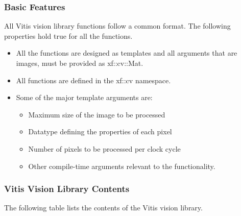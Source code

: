 \subsubsection{Basic Features}
All Vitis vision library functions follow a common format. The following properties hold true for all the functions.
\begin{itemize}
    \item All the functions are designed as templates and all arguments that are images, must be provided as xf::cv::Mat.
    \item All functions are defined in the xf::cv namespace.
    \item Some of the major template arguments are: 
    \begin{itemize}
        \item Maximum size of the image to be processed
        \item Datatype defining the properties of each pixel
        \item Number of pixels to be processed per clock cycle
        \item Other compile-time arguments relevant to the functionality.
    \end{itemize}
\end{itemize}

\subsubsection{Vitis Vision Library Contents}
The following table lists the contents of the Vitis vision library.

